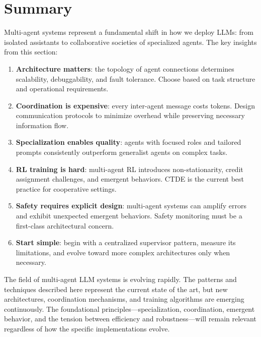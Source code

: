 \section{Summary}
\label{subsec:mas-summary}

Multi-agent systems represent a fundamental shift in how we deploy LLMs: from isolated assistants to collaborative societies of specialized agents. The key insights from this section:

\begin{keybox}
\begin{enumerate}
  \item \textbf{Architecture matters}: the topology of agent connections determines scalability, debuggability, and fault tolerance. Choose based on task structure and operational requirements.
  \item \textbf{Coordination is expensive}: every inter-agent message costs tokens. Design communication protocols to minimize overhead while preserving necessary information flow.
  \item \textbf{Specialization enables quality}: agents with focused roles and tailored prompts consistently outperform generalist agents on complex tasks.
  \item \textbf{RL training is hard}: multi-agent RL introduces non-stationarity, credit assignment challenges, and emergent behaviors. CTDE is the current best practice for cooperative settings.
  \item \textbf{Safety requires explicit design}: multi-agent systems can amplify errors and exhibit unexpected emergent behaviors. Safety monitoring must be a first-class architectural concern.
  \item \textbf{Start simple}: begin with a centralized supervisor pattern, measure its limitations, and evolve toward more complex architectures only when necessary.
\end{enumerate}
\end{keybox}

The field of multi-agent LLM systems is evolving rapidly. The patterns and techniques described here represent the current state of the art, but new architectures, coordination mechanisms, and training algorithms are emerging continuously. The foundational principles---specialization, coordination, emergent behavior, and the tension between efficiency and robustness---will remain relevant regardless of how the specific implementations evolve.

